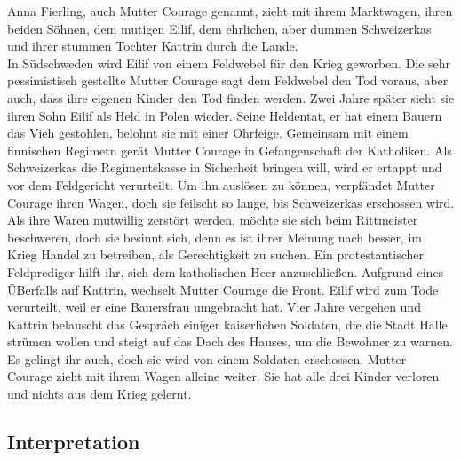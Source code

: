 \documentclass[a4paper]{article}
\begin{document}
	Anna Fierling, auch Mutter Courage genannt, zieht mit ihrem Marktwagen, ihren beiden Söhnen, dem mutigen Eilif, dem ehrlichen, aber dummen Schweizerkas und ihrer stummen Tochter Kattrin durch die Lande.\\
        In Südschweden wird Eilif von einem Feldwebel für den Krieg geworben. Die sehr pessimistisch gestellte Mutter Courage sagt dem Feldwebel den Tod voraus, aber auch, dass ihre eigenen Kinder den Tod finden werden. Zwei Jahre später sieht sie ihren Sohn Eilif als Held in Polen wieder. Seine Heldentat, er hat einem Bauern das Vieh gestohlen, belohnt sie mit einer Ohrfeige. Gemeinsam mit einem finnischen Regimetn gerät Mutter Courage in Gefangenschaft der Katholiken. Als Schweizerkas die Regimentskasse in Sicherheit bringen will, wird er ertappt und vor dem Feldgericht verurteilt. Um ihn auslösen zu können, verpfändet Mutter Courage ihren Wagen, doch sie feilscht so lange, bis Schweizerkas erschossen wird. Als ihre Waren mutwillig zerstört werden, möchte sie sich beim Rittmeister beschweren, doch sie besinnt sich, denn es ist ihrer Meinung nach besser, im Krieg Handel zu betreiben, als Gerechtigkeit zu suchen. Ein protestantischer Feldprediger hilft ihr, sich dem katholischen Heer anzuschließen. Aufgrund eines ÜBerfalls auf Kattrin, wechselt Mutter Courage die Front. Eilif wird zum Tode verurteilt, weil er eine Bauersfrau umgebracht hat. Vier Jahre vergehen und Kattrin belauscht das Gespräch einiger kaiserlichen Soldaten, die die Stadt Halle strümen wollen und steigt auf das Dach des Hauses, um die Bewohner zu warnen. Es gelingt ihr auch, doch sie wird von einem Soldaten erschossen. Mutter Courage zieht mit ihrem Wagen alleine weiter. Sie hat alle drei Kinder verloren und nichts aus dem Krieg gelernt.
        
        \subsection{Interpretation}
\end{document}
